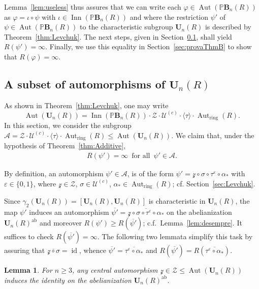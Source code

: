 \documentclass[a4paper,11pt]{amsart}
\numberwithin{equation}{section}
\theoremstyle{plain}
\newtheorem{lem}[thm]{Lemma}
\theoremstyle{definition}
\newcommand{\anel}[1]{#1_{\text{ring}}} %
\newcommand{\mbU}{\mathbf{U}} %
\newcommand{\PB}{\mathbb{P}\mathbf{B}} %
\newcommand{\phee}{\varphi} %
\newcommand{\veps}{\varepsilon} %
\newcommand{\barra}[1]{\overline{#1}}
\newcommand{\gera}[1]{\langle {#1} \rangle}
\newcommand{\set}[1]{\{ #1 \}}
\newcommand{\mc}{\mathcal}
\DeclareMathOperator{\Aut}{Aut}
\DeclareMathOperator{\Inn}{Inn}
\DeclareMathOperator{\id}{id}
\begin{document}
Lemma~\ref{lem:useless} thus assures that we can write each $\phee \in \Aut(\PB_n(R))$ as $\phee = \iota \circ \psi$ with $\iota \in \Inn(\PB_n(R))$ and where the restriction $\psi'$ of $\psi \in \Aut(\PB_n(R))$ to the characteristic subgroup $\mbU_n(R)$ is described by Theorem~\ref{thm:Levchuk}. The next steps, given in Section~\ref{sec:gpA}, shall yield $R(\psi')=\infty$. Finally, we use this equality in Section~\ref{sec:provaThmB} to show that $R(\phee) = \infty$. 

\subsection{A subset of automorphisms of $\mbU_n(R)$}\label{sec:gpA} 
As shown in Theorem~\ref{thm:Levchuk}, one may write
\[\Aut(\mbU_n(R)) = \Inn(\PB_n(R)) \cdot \mc{Z} \cdot \mc{U}^{(c)} \cdot \gera{\tau} \cdot \anel{\Aut}(R). \] 
In this section, we consider the subgroup $\mc{A} = \mc{Z} \cdot \mc{U}^{(c)} \cdot \gera{\tau} \cdot \anel{\Aut}(R) \leq \Aut(\mbU_n(R))$. We claim that, under the hypothesis of Theorem~\ref{thm:Additive}, 
\begin{align} \label{eq:psilinha}
R(\psi') = \infty \, \text{ for all } \, \psi' \in \mc{A}.
\end{align}

By definition, an automorphism $\psi' \in \mc{A}$, is of the form $ \psi' = \mc{z} \circ \sigma \circ \tau^\veps \circ \alpha_\ast$ with  $\veps \in \set{0,1}$, where $\mc{z} \in \mc{Z}$, $\sigma \in \mc{U}^{(c)}$, $\alpha_\ast \in \anel{\Aut}(R)$; cf. Section~\ref{sec:Levchuk}.

Since $\gamma_2(\mbU_n(R)) = [\mbU_n(R), \mbU_n(R)]$ is characteristic in $\mbU_n(R)$, the map $\psi'$ induces an automorphism $\barra{\psi'} = \barra{\mc{z} \circ \sigma \circ \tau^\veps \circ \alpha_\ast}$ on the abelianization $\mbU_n(R)^{\mathrm{ab}}$ and moreover $R(\psi') \geq R(\barra{\psi'})$; c.f.\ Lemma~\ref{lem:desempre}. It suffices to check $R(\barra{\psi'}) = \infty$.
The following two lemmata simplify this task by assuring that $\barra{\mc{z} \circ \sigma} = \id$, whence $\barra{\psi'} = \barra{\tau^\veps \circ \alpha_\ast}$ and $R(\barra{\psi'}) = R(\barra{\tau^\veps \circ \alpha_\ast})$.

\begin{lem} \label{obs:centralautomorphisms2}
For $n \geq 3$, any central automorphism $\mc{z} \in \mc{Z} \leq \Aut(\mbU_n(R))$ induces the identity on the abelianization $\mbU_n(R)^{\mathrm{ab}}$.
\end{lem}
\end{document}
